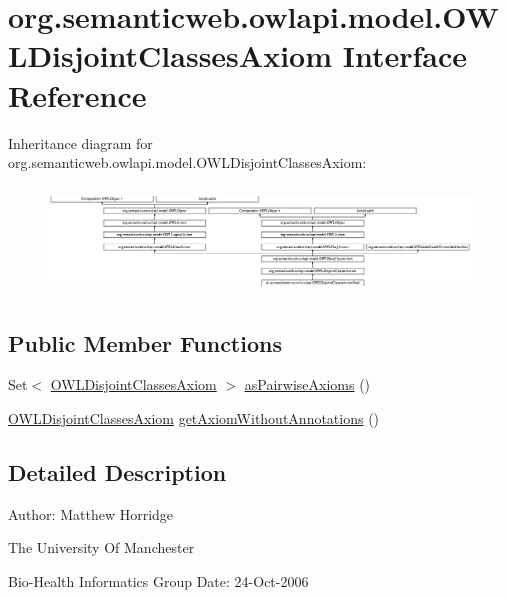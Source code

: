 \hypertarget{interfaceorg_1_1semanticweb_1_1owlapi_1_1model_1_1_o_w_l_disjoint_classes_axiom}{\section{org.\-semanticweb.\-owlapi.\-model.\-O\-W\-L\-Disjoint\-Classes\-Axiom Interface Reference}
\label{interfaceorg_1_1semanticweb_1_1owlapi_1_1model_1_1_o_w_l_disjoint_classes_axiom}
}
Inheritance diagram for org.\-semanticweb.\-owlapi.\-model.\-O\-W\-L\-Disjoint\-Classes\-Axiom\-:\begin{figure}[H]
\begin{center}
\leavevmode
\includegraphics[height=2.857143cm]{interfaceorg_1_1semanticweb_1_1owlapi_1_1model_1_1_o_w_l_disjoint_classes_axiom}
\end{center}
\end{figure}
\subsection*{Public Member Functions}
\begin{DoxyCompactItemize}
\item 
Set$<$ \hyperlink{interfaceorg_1_1semanticweb_1_1owlapi_1_1model_1_1_o_w_l_disjoint_classes_axiom}{O\-W\-L\-Disjoint\-Classes\-Axiom} $>$ \hyperlink{interfaceorg_1_1semanticweb_1_1owlapi_1_1model_1_1_o_w_l_disjoint_classes_axiom_af81486f9bade4b58d861a8f1420f53cf}{as\-Pairwise\-Axioms} ()
\item 
\hyperlink{interfaceorg_1_1semanticweb_1_1owlapi_1_1model_1_1_o_w_l_disjoint_classes_axiom}{O\-W\-L\-Disjoint\-Classes\-Axiom} \hyperlink{interfaceorg_1_1semanticweb_1_1owlapi_1_1model_1_1_o_w_l_disjoint_classes_axiom_a1a4b5649512cbf5b1afec763727a26c3}{get\-Axiom\-Without\-Annotations} ()
\end{DoxyCompactItemize}


\subsection{Detailed Description}
Author\-: Matthew Horridge\par
 The University Of Manchester\par
 Bio-\/\-Health Informatics Group Date\-: 24-\/\-Oct-\/2006 

